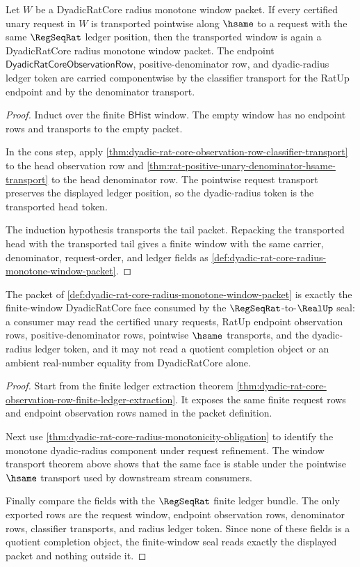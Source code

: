\begin{theorem}
\label{thm:dyadic-rat-core-radius-window-transport}
Let $W$ be a DyadicRatCore radius monotone window packet. If every certified
unary request in $W$ is transported pointwise along $\hsame$ to a request with
the same $\RegSeqRat$ ledger position, then the transported window is again a
DyadicRatCore radius monotone window packet. The endpoint
$\mathsf{DyadicRatCoreObservationRow}$, positive-denominator row, and
dyadic-radius ledger token are carried componentwise by the classifier
transport for the RatUp endpoint and by the denominator transport.
\end{theorem}
\begin{proof}
Induct over the finite $\mathsf{BHist}$ window. The empty window has no
endpoint rows and transports to the empty packet.

In the cons step, apply
\autoref{thm:dyadic-rat-core-observation-row-classifier-transport} to the head
observation row and
\autoref{thm:rat-positive-unary-denominator-hsame-transport} to the head
denominator row. The pointwise request transport preserves the displayed
ledger position, so the dyadic-radius token is the transported head token.

The induction hypothesis transports the tail packet. Repacking the transported
head with the transported tail gives a finite window with the same carrier,
denominator, request-order, and ledger fields as
\autoref{def:dyadic-rat-core-radius-monotone-window-packet}.
\end{proof}

\begin{theorem}
\label{thm:dyadic-rat-core-radius-window-regseq-consumer}
The packet of
\autoref{def:dyadic-rat-core-radius-monotone-window-packet} is exactly the
finite-window DyadicRatCore face consumed by the $\RegSeqRat$-to-$\RealUp$
seal: a consumer may read the certified unary requests, RatUp endpoint
observation rows, positive-denominator rows, pointwise $\hsame$ transports,
and the dyadic-radius ledger token, and it may not read a quotient completion
object or an ambient real-number equality from DyadicRatCore alone.
\end{theorem}
\begin{proof}
Start from the finite ledger extraction theorem
\autoref{thm:dyadic-rat-core-observation-row-finite-ledger-extraction}. It
exposes the same finite request rows and endpoint observation rows named in
the packet definition.

Next use \autoref{thm:dyadic-rat-core-radius-monotonicity-obligation} to
identify the monotone dyadic-radius component under request refinement. The
window transport theorem above shows that the same face is stable under the
pointwise $\hsame$ transport used by downstream stream consumers.

Finally compare the fields with the $\RegSeqRat$ finite ledger bundle. The
only exported rows are the request window, endpoint observation rows,
denominator rows, classifier transports, and radius ledger token. Since none
of these fields is a quotient completion object, the finite-window seal reads
exactly the displayed packet and nothing outside it.
\end{proof}
